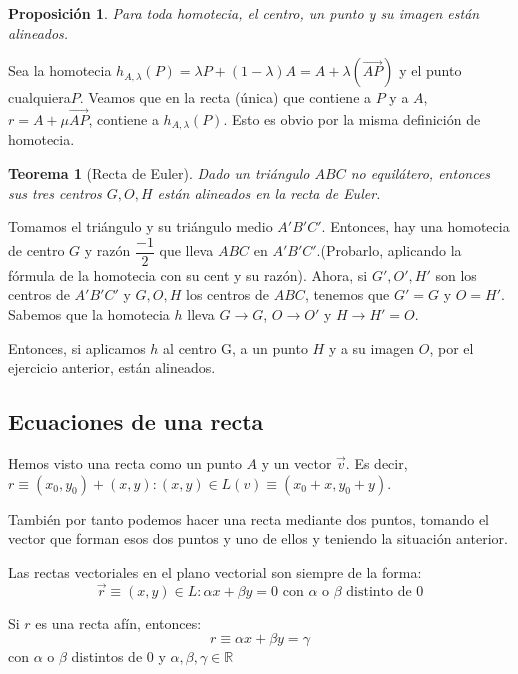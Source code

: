 \documentclass[11pt, a4paper]{article}
\makeatletter
\newif\IfInSansMode
\let\oldsf\sffamily
\renewcommand*{\sffamily}{\oldsf\mathversion{sans}\InSansModetrue}
\let\oldnorm\normalfont
\renewcommand*{\normalfont}{\oldnorm\InSansModefalse\mathversion{normal}}
\renewenvironment{proof}[1][\proofname] {\vspace{-15pt}\par\pushQED{\qed}\normalfont\topsep6\p@\@plus6\p@\relax\trivlist\item[\hskip\labelsep\it#1\@addpunct{.}]\ignorespaces}{\popQED\endtrivlist\@endpefalse}
\newcommand{\R}{\mathbb{R}}
\renewcommand{\vec}{\overrightarrow}
\renewenvironment{proof}[1][\proofname] {\par\pushQED{\qed}\normalfont\topsep6\p@\@plus6\p@\relax\trivlist\item[\hskip\labelsep\itshape\sffamily#1\@addpunct{.}]\ignorespaces}{\popQED\endtrivlist\@endpefalse}
\theoremstyle{theorem-style}
\newtheorem{nth}{Teorema}[section]
\newtheorem{nprop}{Proposición}[section]
\theoremstyle{definition-style}
\theoremstyle{remark-style}
\theoremstyle{example-style}
\makeatother
\begin{document}
\begin{nprop}
	
Para toda homotecia, el centro, un punto y su imagen están alineados.
\end{nprop}

\begin{proof}
	Sea la homotecia $h_{A,\lambda}(P) = \lambda P + (1-\lambda)A = A+\lambda(\vec{AP})$ y el punto cualquiera$P$. Veamos que en la recta (única) que contiene a $P$ y a $ A$, $r= A + \mu \vec{AP}$,  contiene a $h_{A,\lambda} (P)$. Esto es obvio por la misma definición de homotecia.	
\end{proof}


\begin{nth}[Recta de Euler]
  Dado un triángulo $ABC$ no equilátero, entonces sus tres centros $G,O,H$ están alineados en la recta de Euler.
\end{nth}
\begin{proof}
  Tomamos el triángulo y su triángulo medio $A'B'C'$. Entonces, hay una homotecia de centro $G$ y razón $\dfrac{-1}{2}$ que lleva $ABC$ en $A'B'C'$.(Probarlo, aplicando la fórmula de la homotecia con su cent y su razón). 
  Ahora, si $G',O',H'$ son los centros de $A'B'C'$ y $G,O,H$ los centros de $ABC$, tenemos que $G'=G$ y $O=H'$. Sabemos que la homotecia $h$ lleva $G \to G$, $O \to O'$ y $H \to H' = O$.
  
  Entonces, si aplicamos $h$ al centro G, a un punto $H$ y a su imagen $O$, por el ejercicio anterior, están alineados.
  
\end{proof}



\subsection{Ecuaciones de una recta}
Hemos visto una recta como un punto $A$ y un vector $\vec{v}$. Es decir, $r \equiv (x_0,y_0) +(x,y) : (x,y) \in L(v) \equiv (x_0+x,y_0+y) $.

También por tanto podemos hacer una recta mediante dos puntos, tomando el vector que forman esos dos puntos y uno de ellos y teniendo la situación anterior.

Las rectas vectoriales en el plano vectorial son siempre de la forma:
\[
  \vec{r} \equiv (x,y) \in L : \alpha x + \beta y = 0 \text{  con $\alpha$ o $\beta$ distinto de 0}
\]

Si $r$ es una recta afín, entonces:
\[
  r \equiv \alpha x + \beta y = \gamma
\] con $\alpha$ o $\beta$ distintos de $0$ y $\alpha,\beta,\gamma \in \R$
\end{document}
